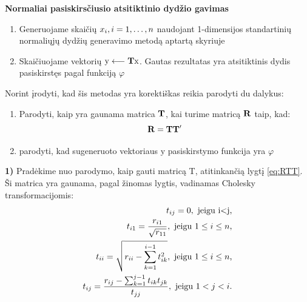 \documentclass[12pt]{article}
\begin{document}
{\bf Normaliai pasiskirsčiusio atsitiktinio dydžio gavimas}

\begin{enumerate}
	
	\item Generuojame skaičių $x_i, \space i = 1, \ldots, n$ naudojant 1-dimensijos standartinių normaliųjų dydžių generavimo metodą aptartą skyriuje \pageref{alg:norm1} 
	
	\item Skaičiuojame vektorių $\bf \mathrm{y} \longleftarrow T\mathrm{x}$. Gautas rezultatas yra atsitiktinis dydis pasiskirstęs pagal funkciją $\varphi$
\end{enumerate}
Norint įrodyti, kad šis metodas yra korektiškas reikia parodyti du dalykus:
\begin{enumerate}
	
	\item Parodyti, kaip yra gaunama matrica $\bf{T}$, kai turime matricą $\bf{R}$ taip, kad:
	\begin{equation}
	\label{eq:RTT}
	\bf	R=TT'
	\end{equation}
	
	\item parodyti, kad sugeneruoto vektoriaus $\mathrm{y}$ pasiskirstymo funkcija yra $\varphi$
\end{enumerate}


{\bf 1)} Pradėkime nuo parodymo, kaip gauti matricą T, atitinkančią lygtį \eqref{eq:RTT}. Ši matrica yra gaunama, pagal žinomas lygtis, vadinamas Cholesky transformacijomis:
\begin{equation}
\begin{split}
t_{ij}=0, \textnormal{ jeigu i<j,}\\
t_{i1}=\frac{r_{i1}}{\sqrt{r_{11}}}, \textnormal{ jeigu  $1 \leq i \leq n$,}\\
t_{ii} = \sqrt{r_{ii} - \sum_{k=1}^{i-1}t_{ik}^2}, \textnormal{ jeigu  $1 \leq i \leq n$,}\\
t_{ij}=\frac{r_{ij} -\sum_{k=1}^{j-1}t_{ik} t_{jk}}{t_{jj}}, \textnormal{ jeigu  $1 < j < i$.}
\end{split}
\end{equation}
\end{document}
